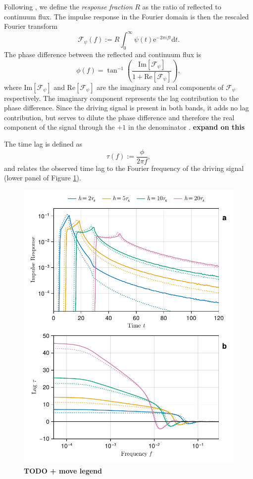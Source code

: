 \documentclass[fleqn,usenatbib]{mnras}
\newcommand{\todo}[1]{{\bf \color{red} #1}}
\newcommand{\e}{\text{e}}
\renewcommand{\d}{\text{d}}
\renewcommand{\Im}[1]{\text{Im}\left[#1\right]}
\renewcommand{\Re}[1]{\text{Re}\left[#1\right]}
\begin{document}
Following \cite{cackett_modelling_2014}, we define the \textit{response fraction} $R$ as the ratio of reflected to continuum flux. The impulse response in the Fourier domain is then the rescaled Fourier transform
\begin{equation}
	\mathscr{F}_\psi(f) := R \int_{0}^\infty \psi(t) \e^{-2\pi i f t} \d t.
\end{equation}
The phase difference between the reflected and continuum flux is 
\begin{equation}
	\phi(f) = \tan^{-1} \left( 
		\frac{\Im{\mathscr{F}_\psi}}{1 + \Re{\mathscr{F}_\psi}} 
	\right),
\end{equation}
where $\Im{\mathscr{F}_\psi}$ and $\Re{\mathscr{F}_\psi}$ are the imaginary and real components of $\mathscr{F}_\psi$ respectively. The imaginary component represents the lag contribution to the phase difference. Since the driving signal is present in both bands, it adds no lag contribution, but serves to dilute the phase difference and therefore the real component of the signal through the $+1$ in the denominator \citep{cackett_modelling_2014}. \todo{expand on this}

The time lag is defined as 
\begin{equation}
	\tau(f) := \frac{\phi}{2 \pi f},
\end{equation}
and relates the observed time lag to the Fourier frequency of the driving signal (lower panel of Figure \ref{fig:reverberation-thin}).

\begin{figure}
	\centering
	\includegraphics[width=0.98\linewidth]{figures/reverberation.thin-disc.pdf}
	\caption{\todo{TODO + move legend}}
	\label{fig:reverberation-thin}
\end{figure}
\end{document}

